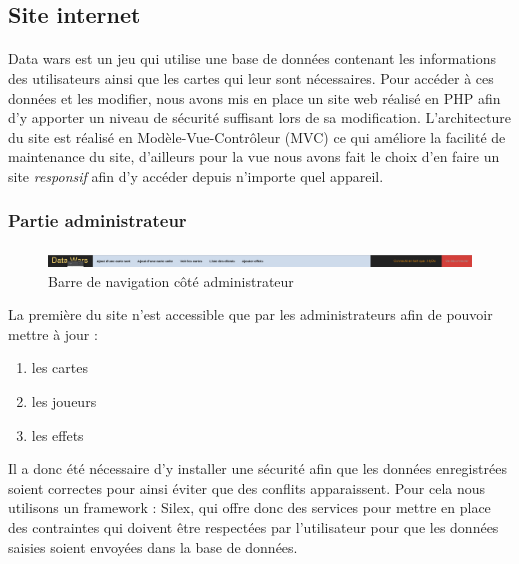 \documentclass[a4paper,11pt]{report}
\title{}
\author{}
\begin{document}
	\subsection{Site internet}

	\paragraph{}
       Data wars est un jeu qui utilise une base de données contenant les informations des utilisateurs ainsi que les cartes qui leur sont nécessaires. Pour accéder à ces données et les modifier, nous avons mis en place un site web réalisé en PHP afin d'y apporter un niveau de sécurité suffisant lors de sa modification. L'architecture du site est réalisé en Modèle-Vue-Contrôleur (MVC) ce qui améliore la facilité de maintenance du site, d’ailleurs pour la vue nous avons fait le choix d'en faire un site \textit{responsif} afin d'y accéder depuis n'importe quel appareil. 

	\subsubsection{Partie administrateur} 
	\paragraph{}

    	\begin{figure}[th]
      	 \begin{center}
          \includegraphics[scale=0.25]{Assets/navbar_admin.png}
          \caption{Barre de navigation côté administrateur}
          \label{RepTravail}
         \end{center}
        \end{figure}

	 La première du site n'est accessible que par les administrateurs afin de pouvoir mettre à jour : 
	\begin{enumerate}
		\item les cartes
		\item les joueurs
		\item les effets
	\end{enumerate}Il a donc été nécessaire d'y installer une sécurité afin que les données enregistrées soient correctes pour ainsi éviter que des conflits apparaissent. Pour cela nous utilisons un framework : Silex, qui offre donc des services pour mettre en place des contraintes qui doivent être respectées par l'utilisateur pour que les données saisies soient envoyées dans la base de données.
\end{document}
